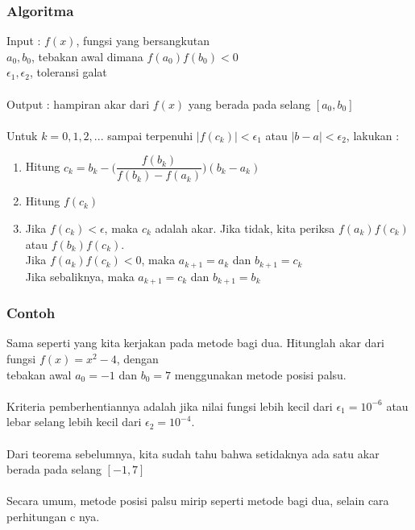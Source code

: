 \documentclass{beamer}
\begin{document}
\begin{frame}
\frametitle{Algoritma}
Input : $f(x)$, fungsi yang bersangkutan
\\\quad \qquad $a_0,b_0$, tebakan awal dimana $f(a_0)f(b_0)<0$
\\\quad \qquad $\epsilon_1,\epsilon_2$, toleransi galat
\\\ \\Output : hampiran akar dari $f(x)$ yang berada pada selang $[a_0,b_0]$
\\\ \\Untuk $k=0,1,2, ...$ sampai terpenuhi $|f(c_k)|<\epsilon_1$ atau $|b-a|<\epsilon_2$, lakukan :
\begin{enumerate}
\item Hitung $c_k = b_k - \biggl(\dfrac{f(b_k)}{f(b_k)-f(a_k)}\biggr)(b_k-a_k)$
\item Hitung $f(c_k)$
\item Jika $f(c_k)<\epsilon$, maka $c_k$ adalah akar. Jika tidak, kita periksa $f(a_k)f(c_k)$ atau $f(b_k)f(c_k)$. \\Jika $f(a_k)f(c_k)<0$, maka $a_{k+1}=a_k$ dan $b_{k+1}=c_k$
\\Jika sebaliknya, maka $a_{k+1}=c_k$ dan $b_{k+1}=b_k$
\end{enumerate} 
\end{frame}


\begin{frame}
\frametitle{Contoh}
Sama seperti yang kita kerjakan pada metode bagi dua. Hitunglah akar dari fungsi $f(x)=x^2-4$, dengan \\tebakan awal $a_0=-1$ dan $b_0=7$ menggunakan metode posisi palsu. \\\ \\Kriteria pemberhentiannya adalah jika nilai fungsi lebih kecil dari $\epsilon_1 = 10^{-6}$ atau lebar selang lebih kecil dari $\epsilon_2 = 10^{-4}$.
\\\ \\Dari teorema sebelumnya, kita sudah tahu bahwa setidaknya ada satu akar berada pada selang $[-1,7]$
\\\ \\Secara umum, metode posisi palsu mirip seperti metode bagi dua, selain cara perhitungan c nya. 
\\\ \\
\end{frame}

\end{document}
